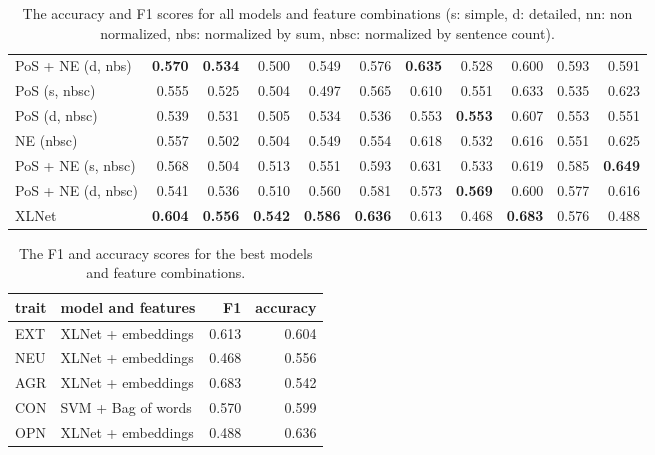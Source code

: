 \documentclass[10pt, a4paper]{article}
\begin{document}
\begin{table}
\begin{center}
\begin{tabular}{lrrrrrrrrrr}
     PoS + NE (d, nbs) & \textbf{0.570} & \textbf{0.534} & 0.500          & 0.549          & 0.576          & \textbf{0.635} & 0.528          & 0.600          & 0.593          &  0.591\\
         PoS (s, nbsc) & 0.555          & 0.525          & 0.504          & 0.497          & 0.565          & 0.610          & 0.551          & 0.633          & 0.535          &  0.623\\
         PoS (d, nbsc) & 0.539          & 0.531          & 0.505          & 0.534          & 0.536          & 0.553          & \textbf{0.553} & 0.607          & 0.553          &  0.551\\
             NE (nbsc) & 0.557          & 0.502          & 0.504          & 0.549          & 0.554          & 0.618          & 0.532          & 0.616          & 0.551          &  0.625\\
    PoS + NE (s, nbsc) & 0.568          & 0.504          & 0.513          & 0.551          & 0.593          & 0.631          & 0.533          & 0.619          & 0.585          &  \textbf{0.649}\\
    PoS + NE (d, nbsc) & 0.541          & 0.536          & 0.510          & 0.560          & 0.581          & 0.573          & \textbf{0.569} & 0.600          & 0.577          &  0.616\\
                 XLNet & \textbf{0.604} & \textbf{0.556} & \textbf{0.542} & \textbf{0.586} & \textbf{0.636} & 0.613          & 0.468          & \textbf{0.683} & 0.576          &  0.488\\
    \bottomrule
  \end{tabular}
  \end{center}
  \caption{The accuracy and F1 scores for all models and feature combinations (s: simple, d: detailed, nn: non normalized, nbs: normalized by sum, nbsc: normalized by sentence count).}
  \label{table:acc-f1}
\end{table}

\begin{table}[H]
  \begin{tabular}{llrr}
    \toprule
    trait & model and features &     F1 & accuracy \\
    \midrule
    EXT &   XLNet + embeddings &  0.613 &  0.604 \\
    NEU &   XLNet + embeddings &  0.468 &  0.556 \\
    AGR &   XLNet + embeddings &  0.683 &  0.542 \\
    CON &   SVM + Bag of words &  0.570 &  0.599 \\
    OPN &   XLNet + embeddings &  0.488 &  0.636 \\
    \bottomrule
  \end{tabular}
  \caption{The F1 and accuracy scores for the best models and feature combinations.}
  \label{table:best}
\end{table}
\end{document}
